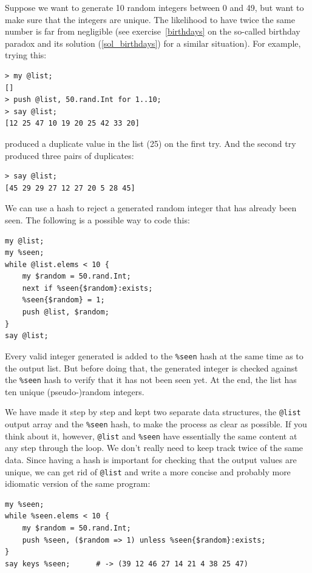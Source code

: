 Suppose we want to generate 10 random integers between 0 and 
49, but want to make sure that the integers are unique. The 
likelihood to have twice the same number is far from 
negligible (see exercise~\ref{birthdays} on the so-called 
birthday paradox and its solution (\ref{sol_birthdays}) for 
a similar situation). For example, trying this:

\begin{verbatim}
> my @list;
[]
> push @list, 50.rand.Int for 1..10;
> say @list;
[12 25 47 10 19 20 25 42 33 20]
\end{verbatim}

produced a duplicate value in the list (25) on the first try.
And the second try produced three pairs of duplicates:

\begin{verbatim}
> say @list;
[45 29 29 27 12 27 20 5 28 45]
\end{verbatim}

We can use a hash to reject a generated random integer 
that has already been seen. The following is a possible way to 
code this:

\begin{verbatim}
my @list;
my %seen;
while @list.elems < 10 {
    my $random = 50.rand.Int;
    next if %seen{$random}:exists;
    %seen{$random} = 1;
    push @list, $random;
}
say @list;
\end{verbatim}

Every valid integer generated is added to the \verb'%seen' 
hash at the same time as to the output list. But before doing 
that, the generated integer is checked against the 
\verb'%seen' hash to verify that it has not been seen yet. 
At the end, the list has ten unique (pseudo-)random integers.

We have made it step by step and kept two separate data 
structures, the \verb'@list' output array and the 
\verb'%seen' hash, to make the process as clear as possible. 
If you think about it, however, \verb'@list' and \verb'%seen' 
have essentially the same content at any step through the 
loop. We don't really need to keep track twice of the same 
data. Since having a hash is important for checking that the 
output values are unique, we can get rid of \verb'@list' 
and write a more concise and probably more idiomatic version 
of the same program:

\begin{verbatim}
my %seen;
while %seen.elems < 10 {
	my $random = 50.rand.Int;
	push %seen, ($random => 1) unless %seen{$random}:exists;
}
say keys %seen;      # -> (39 12 46 27 14 21 4 38 25 47)
\end{verbatim}

